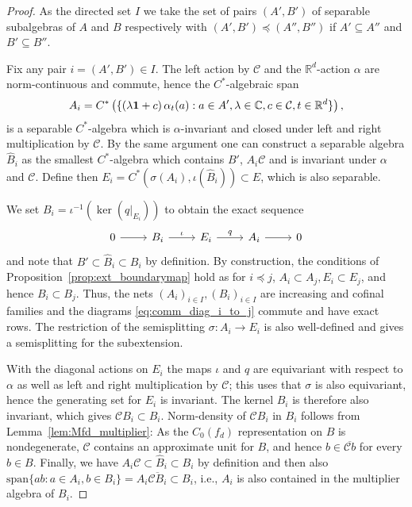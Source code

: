 \documentclass[12pt]{amsart}
\newcommand{\CM}{{\mathbb C}}
\newcommand{\RM}{{\mathbb R}}
\newcommand{\Cc}{{\mathcal C}}
\newcommand{\one}{{\bf 1}}
\begin{document}
\begin{proof}
As the directed set $I$ we take the set of pairs $(A',B')$ of separable subalgebras of $A$ and $B$ respectively with $(A',B') \preceq (A'', B'')$ if $A'\subseteq A''$ and $B'\subseteq B''$. 

Fix any pair $i=(A',B') \in I$. The left action by $\Cc$ and the $\RM^d$-action $\alpha$ are norm-continuous and commute, hence the $C^*$-algebraic span
$$A_i= C^*\left(\{(\lambda \one+c)\,\alpha_{t}(a): a\in A', \lambda\in \CM, c\in \Cc, t\in \mathbb{R}^d\}\right),$$
is a separable $C^*$-algebra which is $\alpha$-invariant and closed under left and right multiplication by $\Cc$. By the same argument one can construct a separable algebra $\hat{B}_i$ as the smallest $C^*$-algebra which contains $B'$, $A_i \Cc$ and is invariant under $\alpha$ and $\Cc$. Define then $E_i=C^*(\sigma(A_i), \iota(\hat{B}_i)) \subset E$, which is also separable.

We set $B_i = \iota^{-1}(\ker(q\rvert_{E_i}))$ to obtain the exact sequence
\[\begin{tikzcd}
	0 & {B_i} & {E_i} & {A_i} & 0
	\arrow[from=1-1, to=1-2]
	\arrow["{\iota}", from=1-2, to=1-3]
	\arrow["{q}", from=1-3, to=1-4]
	\arrow[from=1-4, to=1-5]
\end{tikzcd}\]
and note that $B'\subset \hat{B}_i\subset B_i$ by definition. 
By construction, the conditions of Proposition~\ref{prop:ext_boundarymap} hold as for $i \preceq j$, $A_i \subset A_j, E_i \subset E_j$, and hence $B_i \subset B_j$.
Thus, the nets $(A_i)_{i\in I}, (B_i)_{i\in I}$ are increasing and cofinal families and the diagrams \eqref{eq:comm_diag_i_to_j} commute and have exact rows. The restriction of the semisplitting $\sigma: A_i\to E_i$ is also well-defined and gives a semisplitting for the subextension.

With the diagonal actions on $E_i$ the maps $\iota$ and $q$ are equivariant with respect to $\alpha$ as well as left and right multiplication by $\Cc$; this uses that $\sigma$ is also equivariant, hence the generating set for $E_i$ is invariant. 
The kernel $B_i$ is therefore also invariant, which gives $\Cc B_i\subset B_i$. Norm-density of $\Cc B_i$ in $B_i$ follows from Lemma~\ref{lem:Mfd_multiplier}: 
As the $C_0(f_d)$ representation on $B$ is nondegenerate, $\Cc$ contains an approximate unit for $B$, and hence $b\in \overline{\Cc b}$ for every $b\in B$. 
Finally, we have $A_i\Cc \subset \hat{B}_i\subset B_i$ by definition and then also $\mathrm{span} \{ab: a\in A_i,b\in B_i\} = A_i \overline{\Cc B_i} \subset B_i$, i.e., $A_i$ is also contained in the multiplier algebra of $B_i$.

\end{proof}
\end{document}

